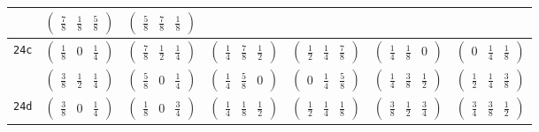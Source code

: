 \documentclass[fleqn,9pt,landscape]{jsarticle}
\begin{document}
\begin{center}
\begin{longtable}{ccccccc}
& $ \begin{pmatrix} \frac{7}{8} & \frac{1}{8} & \frac{5}{8} \end{pmatrix} $ & $ \begin{pmatrix} \frac{5}{8} & \frac{7}{8} & \frac{1}{8} \end{pmatrix} $ & $  $ & $  $ & $  $ & $  $ \\ \hline
{\tt 24c} & $ \begin{pmatrix} \frac{1}{8} & 0 & \frac{1}{4} \end{pmatrix} $ & $ \begin{pmatrix} \frac{7}{8} & \frac{1}{2} & \frac{1}{4} \end{pmatrix} $ & $ \begin{pmatrix} \frac{1}{4} & \frac{7}{8} & \frac{1}{2} \end{pmatrix} $ & $ \begin{pmatrix} \frac{1}{2} & \frac{1}{4} & \frac{7}{8} \end{pmatrix} $ & $ \begin{pmatrix} \frac{1}{4} & \frac{1}{8} & 0 \end{pmatrix} $ & $ \begin{pmatrix} 0 & \frac{1}{4} & \frac{1}{8} \end{pmatrix} $ \\
& $ \begin{pmatrix} \frac{3}{8} & \frac{1}{2} & \frac{1}{4} \end{pmatrix} $ & $ \begin{pmatrix} \frac{5}{8} & 0 & \frac{1}{4} \end{pmatrix} $ & $ \begin{pmatrix} \frac{1}{4} & \frac{5}{8} & 0 \end{pmatrix} $ & $ \begin{pmatrix} 0 & \frac{1}{4} & \frac{5}{8} \end{pmatrix} $ & $ \begin{pmatrix} \frac{1}{4} & \frac{3}{8} & \frac{1}{2} \end{pmatrix} $ & $ \begin{pmatrix} \frac{1}{2} & \frac{1}{4} & \frac{3}{8} \end{pmatrix} $ \\ \hline
{\tt 24d} & $ \begin{pmatrix} \frac{3}{8} & 0 & \frac{1}{4} \end{pmatrix} $ & $ \begin{pmatrix} \frac{1}{8} & 0 & \frac{3}{4} \end{pmatrix} $ & $ \begin{pmatrix} \frac{1}{4} & \frac{1}{8} & \frac{1}{2} \end{pmatrix} $ & $ \begin{pmatrix} \frac{1}{2} & \frac{1}{4} & \frac{1}{8} \end{pmatrix} $ & $ \begin{pmatrix} \frac{3}{8} & \frac{1}{2} & \frac{3}{4} \end{pmatrix} $ & $ \begin{pmatrix} \frac{3}{4} & \frac{3}{8} & \frac{1}{2} \end{pmatrix} $ \\

\end{longtable}
\end{center}
\end{document}
